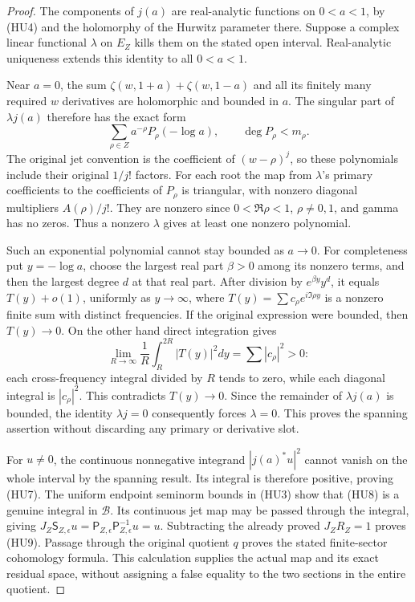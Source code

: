 \documentclass[11pt]{article}
\newcommand{\B}{\mathscr B}\newcommand{\M}{\mathcal M}
\begin{document}
\begin{proof}
The components of $j(a)$ are real-analytic functions on $0<a<1$,
by (HU4) and the holomorphy of the Hurwitz parameter there.
Suppose a complex linear functional $\lambda$ on $E_Z$ kills
them on the stated open interval. Real-analytic uniqueness extends
this identity to all $0<a<1$.

Near $a=0$, the sum
$\zeta(w,1+a)+\zeta(w,1-a)$ and all its finitely many required
$w$ derivatives are holomorphic and bounded in $a$.
The singular part of $\lambda j(a)$ therefore has the exact form
\[
 \sum_{\rho\in Z}a^{-\rho}P_\rho(-\log a),
       \qquad \deg P_\rho<m_\rho.
 \tag{HU10}
\]
The original jet convention is the coefficient of $(w-\rho)^j$,
so these polynomials include their original $1/j!$ factors.
For each root the map from $\lambda$'s primary coefficients to
the coefficients of $P_\rho$ is triangular, with nonzero diagonal
multipliers $A(\rho)/j!$. They are nonzero since
$0<\Re\rho<1$, $\rho\ne0,1$, and gamma has no zeros.
Thus a nonzero $\lambda$ gives at least one nonzero polynomial.

Such an exponential polynomial cannot stay bounded as $a\to0$.
For completeness put $y=-\log a$, choose the largest real part
$\beta>0$ among its nonzero terms, and then the largest degree $d$
at that real part. After division by $e^{\beta y}y^d$, it equals
$T(y)+o(1)$, uniformly as $y\to\infty$, where
$T(y)=\sum c_\rho e^{i\Im\rho y}$ is a nonzero finite sum with
distinct frequencies. If the original expression were bounded,
then $T(y)\to0$. On the other hand direct integration gives
\[
 \lim_{R\to\infty}\frac1R\int_R^{2R}|T(y)|^2dy
       =\sum |c_\rho|^2>0:
\]
each cross-frequency integral divided by $R$ tends to zero,
while each diagonal integral is $|c_\rho|^2$. This contradicts
$T(y)\to0$. Since the remainder of $\lambda j(a)$ is bounded,
the identity $\lambda j=0$ consequently forces $\lambda=0$.
This proves the spanning assertion without discarding any primary
or derivative slot.

For $u\ne0$, the continuous nonnegative integrand
$|j(a)^*u|^2$ cannot vanish on the whole interval by the spanning
result. Its integral is therefore positive, proving (HU7).
The uniform endpoint seminorm bounds in (HU3) show that (HU8)
is a genuine integral in $\B$. Its continuous jet map may be
passed through the integral, giving
$J_Z\mathsf S_{Z,\epsilon}u
=\mathsf P_{Z,\epsilon}\mathsf P_{Z,\epsilon}^{-1}u=u$.
Subtracting the already proved $J_ZR_Z=1$ proves (HU9).
Passage through the original quotient $q$ proves the stated
finite-sector cohomology formula. This calculation supplies the
actual map and its exact residual space, without assigning a
false equality to the two sections in the entire quotient.
\end{proof}
\end{document}
